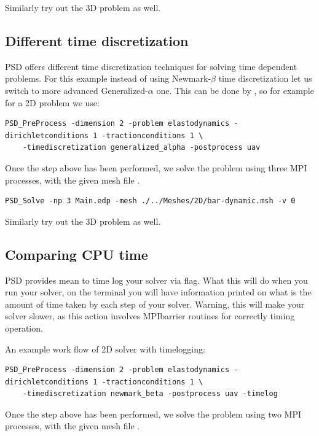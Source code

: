 Similarly try out the 3D problem as well.

\subsection{Different time discretization}

PSD offers different time discretization techniques for solving time dependent problems. For this example instead of using Newmark-$\beta$ time  discretization let us switch to more advanced Generalized-$\alpha$ one. This can be done by , so for example for a 2D problem we use:

\begin{lstlisting}[style=BashInputStyle]
	PSD_PreProcess -dimension 2 -problem elastodynamics -dirichletconditions 1 -tractionconditions 1 \
	-timediscretization generalized_alpha -postprocess uav
\end{lstlisting}

Once the step above has been performed, we solve the problem using three MPI processes, with the given mesh file . 

\begin{lstlisting}[style=BashInputStyle]
	PSD_Solve -np 3 Main.edp -mesh ./../Meshes/2D/bar-dynamic.msh -v 0
\end{lstlisting}

Similarly try out the 3D problem as well.

\subsection{Comparing CPU time}

PSD provides mean to time log your solver via  flag. What this will do when you run your solver, on the terminal you will have information printed on what is the amount of time taken by each step of your solver. Warning, this will make your solver slower, as this action involves MPIbarrier routines for correctly timing operation. 

An example work flow of 2D solver with timelogging:

\begin{lstlisting}[style=BashInputStyle]
	PSD_PreProcess -dimension 2 -problem elastodynamics -dirichletconditions 1 -tractionconditions 1 \
	-timediscretization newmark_beta -postprocess uav -timelog
\end{lstlisting}

Once the step above has been performed, we solve the problem using two MPI processes, with the given mesh file . 

